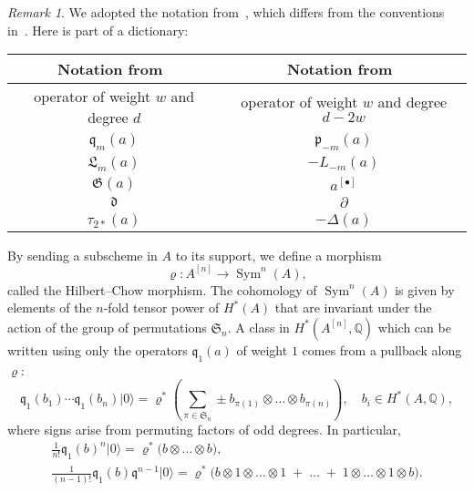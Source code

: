 \documentclass{alggeom}
\DeclareMathOperator{\Sym}{Sym}
\renewcommand{\rho}{\varrho}
\newcommand{\hilb}[1]{^{[#1]}}
\newcommand{\vac}{|0\rangle}
\newcommand{\p}{\mathfrak{p}}
\newcommand{\q}{\mathfrak{q}}
\newcommand{\Q}{\mathbb{Q}}
\theoremstyle{plain}
\theoremstyle{definition}
\theoremstyle{remark}
\newtheorem{remark}[theorem]{Remark}
\begin{document}
\begin{remark}
We adopted the notation from~\cite{LiQinWang}, which differs from the conventions in~\cite{LehnSorger}. Here is part of a dictionary:
\begin{center}
\begin{tabular}{c|c} 
Notation from~\cite{LiQinWang} & Notation from~\cite{LehnSorger} \\\hline
operator of weight $w$ and degree $d$ & operator of weight $w$ and degree $d-2w$\\
$\q_m(a) $ & $\p_{-m}(a)$ \\
$ \mathfrak{L}_m(a) $ & $ - L_{-m}(a)$ \\
$\mathfrak{G}(a)$ & $a\hilb{\bullet}$\\
$ \mathfrak{d} $ & $ \partial $ \\
$\tau_{2*}(a)$& $-\Delta(a)$
\end{tabular}
\end{center}
\end{remark}

By sending a subscheme in $A$ to its support, we define a morphism
\begin{equation}\label{HilbertChow}
\rho : A\hilb{n} \longrightarrow \Sym^n(A),
\end{equation}
called the Hilbert--Chow morphism. The cohomology of $\Sym^n(A)$ is given by elements of the $n$-fold tensor power of $H^*(A)$ that are invariant under the action of the group of permutations $\mathfrak{S}_n$. A class in $H^*(A\hilb{n},\Q)$ which can be written using only the operators $\q_1(a)$ of weight $1$ comes from a pullback along $\rho$:
\begin{equation}
\label{qSym}
\q_1(b_1)\cdots \q_1(b_n)\vac = \rho^*\left( \sum_{\pi\in\mathfrak{S}_n } \pm b_{\pi(1)}\otimes\ldots\otimes b_{\pi(n)} \right), \quad b_i\in H^*(A,\Q),
\end{equation}
where signs arise from permuting factors of odd degrees. In particular,
\begin{gather} \label{q0primitive}
\frac{1}{n!}\q_1(b)^n \vac = \rho^*\big( b\otimes \ldots \otimes b\big),
\\ \label{q1primitive}
\frac{1}{(n-1)!}\q_1(b)\q^{n-1}\vac =\rho^*\Big( b\otimes\! 1\!\otimes\ldots\otimes\! 1\; + \;\ldots\; +\; 1\!\otimes\ldots\otimes\! 1\! \otimes b\Big) .
\end{gather}
\end{document}
